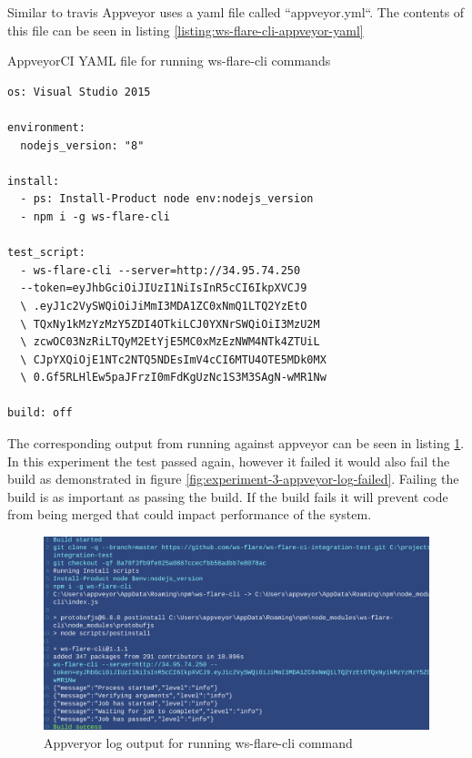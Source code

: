 Similar to travis Appveyor uses a yaml file called ``appveyor.yml``. The contents of this file can be seen in listing \ref{listing:ws-flare-cli-appveyor-yaml}

\begin{listing}[H]
    \caption{AppveyorCI YAML file for running ws-flare-cli commands}
    \label{listing:ws-flare-cli-appveyor-yaml}
    \begin{verbatim}
os: Visual Studio 2015

environment:
  nodejs_version: "8"

install:
  - ps: Install-Product node env:nodejs_version
  - npm i -g ws-flare-cli

test_script:
  - ws-flare-cli --server=http://34.95.74.250 
  --token=eyJhbGciOiJIUzI1NiIsInR5cCI6IkpXVCJ9
  \ .eyJ1c2VySWQiOiJiMmI3MDA1ZC0xNmQ1LTQ2YzEtO
  \ TQxNy1kMzYzMzY5ZDI4OTkiLCJ0YXNrSWQiOiI3MzU2M
  \ zcwOC03NzRiLTQyM2EtYjE5MC0xMzEzNWM4NTk4ZTUiL
  \ CJpYXQiOjE1NTc2NTQ5NDEsImV4cCI6MTU4OTE5MDk0MX
  \ 0.Gf5RLHlEw5paJFrzI0mFdKgUzNc1S3M3SAgN-wMR1Nw

build: off
\end{verbatim}
\end{listing}

The corresponding output from running against appveyor can be seen in listing \ref{fig:experiment-3-appveyor-log}. In this experiment the test passed again, however it failed it would also fail the build as demonstrated in figure \ref{fig:experiment-3-appveyor-log-failed}. Failing the build is as important as passing the build. If the build fails it will prevent code from being merged that could impact performance of the system.

\begin{figure}[H]
  \centering
    \includegraphics[width=1\textwidth]{figures/experiments/experiment-3/appveyor-output.png}
    \caption{Appveryor log output for running ws-flare-cli command}
    \label{fig:experiment-3-appveyor-log}
\end{figure}

